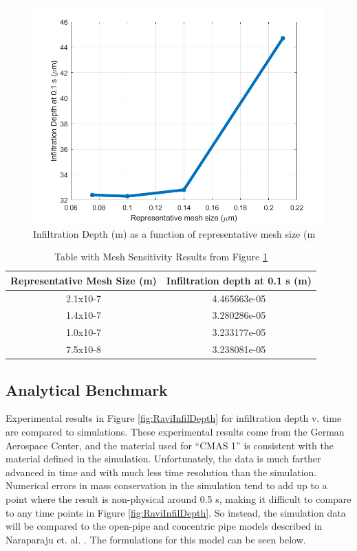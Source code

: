 \documentclass[conf]{new-aiaa}
\begin{document}
\begin{figure}
    \centering
    \includegraphics[scale=0.55]{Figures/infilDepthMesh.png}
    \caption{Infiltration Depth (m) as a function of representative mesh size (m}
    \label{fig:meshSensResults}
\end{figure}

\begin{table}[]
    \centering
    \caption{Table with Mesh Sensitivity Results from Figure \ref{fig:meshSensResults}}
    \begin{tabular}{c|c}
       Representative Mesh Size (m)  & Infiltration depth at 0.1 s (m) \\
       \hline
        2.1x10-7 & 4.465663e-05 \\
        1.4x10-7 & 3.280286e-05 \\
        1.0x10-7 & 3.233177e-05 \\
        7.5x10-8 & 3.238081e-05
    \end{tabular}
    \label{tab:meshSensResults}
\end{table}

\subsection{Analytical Benchmark}
Experimental results in Figure \ref{fig:RaviInfilDepth} for infiltration depth v. time are compared to simulations. These experimental results come from the German Aerospace Center, and the material used for “CMAS 1” is consistent with the material defined in the simulation. Unfortunately, the data is much farther advanced in time and with much less time resolution than the simulation. Numerical errors in mass conservation in the simulation tend to add up to a point where the result is non-physical around 0.5 s, making it difficult to compare to any time points in Figure \ref{fig:RaviInfilDepth}.  So instead, the simulation data will be compared to the open-pipe and concentric pipe models described in Naraparaju et. al. \cite{Naraparaju2019}. The formulations for this model can be seen below. 
\end{document}
